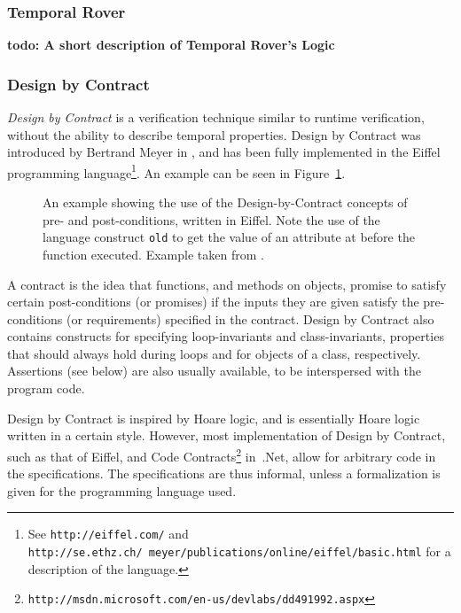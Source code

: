 \documentclass[a4paper,11pt]{kth-mag}
\newcommand{\todo}[1]{\textbf{todo: #1}}
\begin{document}
\subsubsection{Temporal Rover}

\todo{A short description of Temporal Rover's Logic}


\subsubsection{Design by Contract}

\textit{Design by Contract} is a verification technique similar to runtime
verification, without the ability to describe temporal properties. Design by
Contract was introduced by Bertrand Meyer in \cite{meyer92applyingdbc}, and has
been fully implemented in the Eiffel programming language\footnote{See
\texttt{http://eiffel.com/} and
\texttt{http://se.ethz.ch/~meyer/publications/online/eiffel/basic.html} for a
description of the language.}. An example can be seen in
Figure~\ref{figure-dbc-example}.

\begin{figure}[h!]
	\begin{center}
	\begin{minipage}{0.7\textwidth}
    \lstset{language=Eiffel}
		
	\end{minipage}
	\end{center}
  \caption{An example showing the use of the Design-by-Contract concepts of
    pre- and post-conditions, written in Eiffel. Note the use of the language
    construct \texttt{old} to get the value of an attribute at before the
    function executed. Example taken from \cite{meyer92applyingdbc}.}
	\label{figure-dbc-example}
\end{figure}

A contract is the idea that functions, and methods on objects, promise to
satisfy certain post-conditions (or promises) if the inputs they are given
satisfy the pre-conditions (or requirements) specified in the contract. Design
by Contract also contains constructs for specifying loop-invariants and
class-invariants, properties that should always hold during loops and for
objects of a class, respectively. Assertions (see below) are also usually
available, to be interspersed with the program code.

Design by Contract is inspired by Hoare logic, and is essentially Hoare logic
written in a certain style. However, most implementation of Design by Contract,
such as that of Eiffel, and Code
Contracts\footnote{\texttt{http://msdn.microsoft.com/en-us/devlabs/dd491992.aspx}}
in~.Net, allow for arbitrary code in the specifications. The specifications are
thus informal, unless a formalization is given for the programming language
used.
\end{document}

